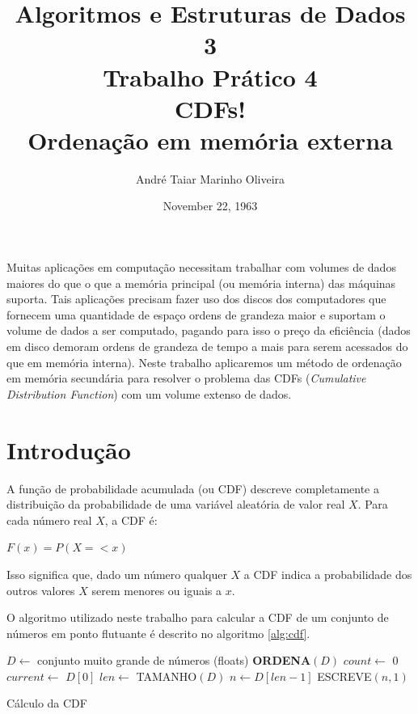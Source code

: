 \documentclass[12pt]{article}
\title{Algoritmos e Estruturas de Dados 3 \\ Trabalho Prático 4 \\
\huge{CDFs! \\ Ordenação em memória externa}}
\date{November 22, 1963}
\author{André Taiar Marinho Oliveira}
\begin{document}
\maketitle

\begin{resumo}
Muitas aplicações em computação necessitam trabalhar com volumes de dados maiores do que
o que a memória principal (ou memória interna) das máquinas suporta. Tais aplicações precisam
fazer uso dos discos dos computadores que fornecem uma quantidade de espaço ordens de grandeza 
maior e suportam o volume de dados a ser computado, pagando para isso o preço da eficiência (dados 
em disco demoram ordens de grandeza de tempo a mais para serem acessados do que em memória interna).
Neste trabalho aplicaremos um método de ordenação em memória secundária para resolver o problema
das CDFs (\textit{Cumulative Distribution Function}) com um volume extenso de dados.
\end{resumo}

\section{Introdução}

A função de probabilidade acumulada (ou CDF) descreve completamente a
distribuição da probabilidade de uma variável aleatória de valor real $X$. 
Para cada número real $X$, a CDF é:

$F(x) = P(X =< x)$

Isso significa que, dado um número qualquer $X$ a CDF indica a probabilidade dos
outros valores $X$ serem menores ou iguais a $x$.

O algoritmo utilizado neste trabalho para calcular a CDF de um conjunto de
números em ponto flutuante é descrito no algoritmo \ref{alg:cdf}.

\begin{algorithm}[h!]
\label{alg:cdf}
\begin{footnotesize}
$D \longleftarrow $ conjunto muito grande de números (floats)\;
\textbf{ORDENA}$(D)$\; 
$count \longleftarrow$ 0\;
$current \longleftarrow$ $D[0]$\;
$len \longleftarrow$ TAMANHO$(D)$\;
$n \longleftarrow D[len - 1]$\;
ESCREVE$(n, 1)$\;
\caption{Cálculo da CDF}
\end{footnotesize}
\end{algorithm}
\end{document}

